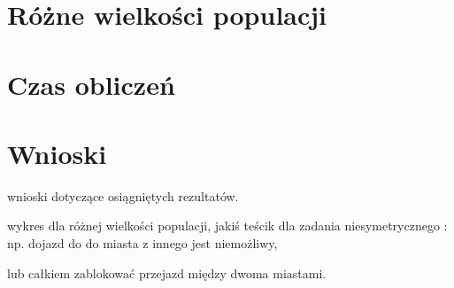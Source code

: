 \documentclass[12pt, oneside, final]{report}
\begin{document}
\section{Różne wielkości populacji}

\section{Czas obliczeń}
 
\section{Wnioski}
wnioski dotyczące osiągniętych rezultatów. 

wykres dla różnej wielkości populacji,
jakiś teścik dla zadania niesymetrycznego : np. dojazd do do miasta z innego jest niemożliwy,

lub całkiem zablokować przejazd między dwoma miastami.
\end{document}
